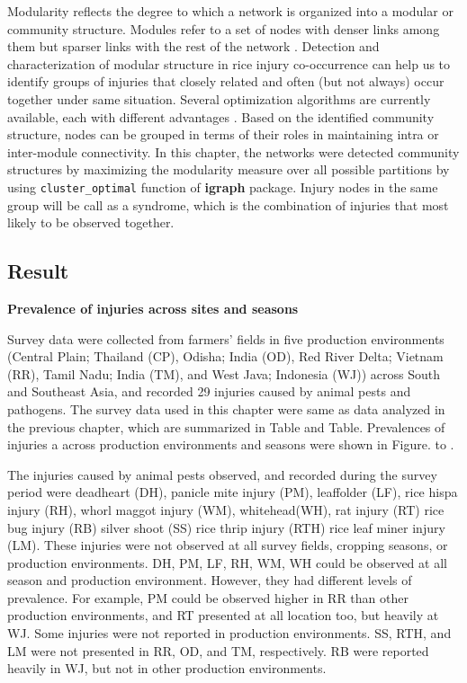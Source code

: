 Modularity reflects the degree to which a network is organized into a modular or community structure. Modules refer to a set of nodes with denser links among them but sparser links with the rest of the network \citep{Newman_2006_Modularity}. Detection and characterization of modular structure in rice injury co-occurrence can help us to identify groups of injuries that closely related and often (but not always) occur together under same situation. Several optimization algorithms are currently available, each with different advantages \citep{Brandes_2008_Modularity}. Based on the identified community structure, nodes can be grouped in terms of their roles in maintaining intra or inter-module connectivity. In this chapter, the networks were detected community structures by maximizing the modularity measure over all possible partitions by using \texttt{cluster\_optimal} function of \textbf{igraph} package. Injury nodes in the same group will be call as a syndrome, which is the combination of injuries that most likely to be observed together. 

\subsection{Result}

\textbf{Prevalence of injuries across sites and seasons}

Survey data were collected from farmers’ fields in five production environments (Central Plain; Thailand (CP), Odisha; India (OD), Red River Delta; Vietnam (RR), Tamil Nadu; India (TM), and West Java; Indonesia (WJ)) across South and Southeast Asia, and recorded 29 injuries caused by animal pests and pathogens.  The survey data used in this chapter were same as data analyzed in the previous chapter, which are summarized in Table and Table. Prevalences of injuries a across production environments and seasons were shown in Figure.\label{fig:barplot1} to \label{fig:barplot3} . 

The injuries caused by animal pests observed, and recorded during the survey period were deadheart (DH), panicle mite injury (PM), leaffolder (LF), rice hispa injury (RH), whorl maggot injury (WM), whitehead(WH), rat injury (RT) rice bug injury (RB) silver shoot (SS) rice thrip injury (RTH) rice leaf miner injury (LM). These injuries were not observed at all survey fields, cropping seasons, or production environments.  DH, PM, LF, RH, WM, WH could be observed at all season and production environment. However, they had different levels of prevalence. For example, PM could be observed higher in RR than other production environments, and RT presented at all location too, but heavily at WJ. Some injuries were not reported in production environments. SS, RTH, and LM were not presented in RR, OD, and TM, respectively. RB were reported heavily in WJ, but not in other production environments.  
 
